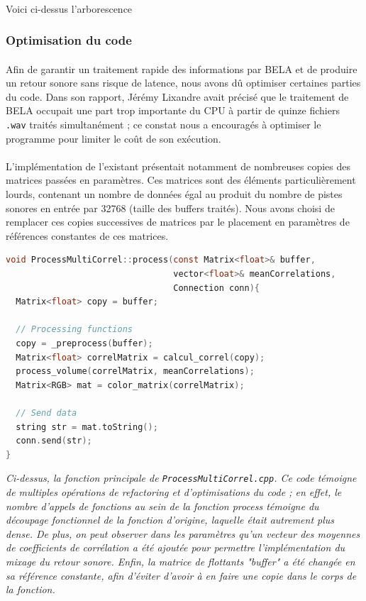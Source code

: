 \paragraph{}
Voici ci-dessus l'arborescence


\subsubsection{Optimisation du code}
\paragraph{}
Afin de garantir un traitement rapide des informations par BELA et de
produire un retour sonore sans risque de latence, nous avons dû
optimiser certaines parties du code. Dans son rapport, Jérémy Lixandre
avait précisé que le traitement de BELA occupait une part trop
importante du CPU à partir de quinze fichiers \verb!.wav! traités
simultanément ; ce constat nous a encouragés à optimiser le programme
pour limiter le coût de son exécution.
\paragraph{}
L'implémentation de l'existant présentait notamment de nombreuses
copies des matrices passées en paramètres. Ces matrices sont des
éléments particulièrement lourds, contenant un nombre de données égal
au produit du nombre de pistes sonores en entrée par 32768 (taille des
buffers traités). Nous avons choisi de remplacer ces copies
successives de matrices par le placement en paramètres de références
constantes de ces matrices.

\begin{lstlisting}[language=C, frame=single, breaklines=true]
void ProcessMultiCorrel::process(const Matrix<float>& buffer,
                                 vector<float>& meanCorrelations,
                                 Connection conn){
  Matrix<float> copy = buffer;

  // Processing functions
  copy = _preprocess(buffer);
  Matrix<float> correlMatrix = calcul_correl(copy);
  process_volume(correlMatrix, meanCorrelations);
  Matrix<RGB> mat = color_matrix(correlMatrix);

  // Send data
  string str = mat.toString();
  conn.send(str);
}
\end{lstlisting}
\begin{center}
 \textit{Ci-dessus, la fonction principale de
  \verb!ProcessMultiCorrel.cpp!. Ce code témoigne de multiples
  opérations de refactoring et d'optimisations du code ; en effet,
  le nombre d'appels de fonctions au sein de la fonction process témoigne du
  découpage fonctionnel de la fonction d'origine, laquelle était autrement
  plus dense. De plus, on peut observer dans les paramètres qu'un
  vecteur des moyennes de coefficients de corrélation a été ajoutée
  pour permettre l'implémentation du mixage du retour sonore. Enfin,
  la matrice de flottants "buffer" a été changée en sa référence
  constante, afin d'éviter d'avoir à en faire une copie dans le
 corps de la fonction.}
\end{center}

